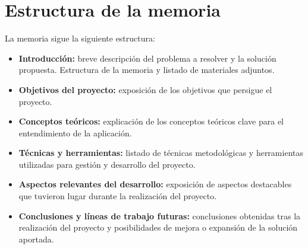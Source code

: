 \section{Estructura de la memoria}\label{estructura-de-la-memoria}

La memoria sigue la siguiente estructura:

\begin{itemize}
\tightlist
\item
  \textbf{Introducción:} breve descripción del problema a resolver y la
  solución propuesta. Estructura de la memoria y listado de materiales
  adjuntos.
\item
  \textbf{Objetivos del proyecto:} exposición de los objetivos que
  persigue el proyecto.
\item
  \textbf{Conceptos teóricos:} explicación de los conceptos
  teóricos clave para el entendimiento de la aplicación.
\item
  \textbf{Técnicas y herramientas:} listado de técnicas metodológicas y
  herramientas utilizadas para gestión y desarrollo del proyecto.
\item
  \textbf{Aspectos relevantes del desarrollo:} exposición de aspectos
  destacables que tuvieron lugar durante la realización del proyecto.
\item
  \textbf{Conclusiones y líneas de trabajo futuras:} conclusiones
  obtenidas tras la realización del proyecto y posibilidades de mejora o
  expansión de la solución aportada.
\end{itemize}

